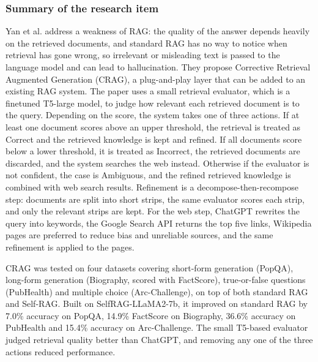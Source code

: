 \documentclass{FastFyp}
\begin{document}
\subsubsection{Summary of the research item}
Yan et al. \cite{yan2024corrective} address a weakness of RAG: the quality of the answer depends heavily on the retrieved documents, and standard RAG has no way to notice when retrieval has gone wrong, so irrelevant or misleading text is passed to the language model and can lead to hallucination. They propose Corrective Retrieval Augmented Generation (CRAG), a plug-and-play layer that can be added to an existing RAG system. The paper uses a small retrieval evaluator, which is a finetuned T5-large model, to judge how relevant each retrieved document is to the query. Depending on the score, the system takes one of three actions. If at least one document scores above an upper threshold, the retrieval is treated as Correct and the retrieved knowledge is kept and refined. If all documents score below a lower threshold, it is treated as Incorrect, the retrieved documents are discarded, and the system searches the web instead. Otherwise if the evaluator is not confident, the case is Ambiguous, and the refined retrieved knowledge is combined with web search results. Refinement is a decompose-then-recompose step: documents are split into short strips, the same evaluator scores each strip, and only the relevant strips are kept. For the web step, ChatGPT rewrites the query into keywords, the Google Search API returns the top five links, Wikipedia pages are preferred to reduce bias and unreliable sources, and the same refinement is applied to the pages.

CRAG was tested on four datasets covering short-form generation (PopQA), long-form generation (Biography, scored with FactScore), true-or-false questions (PubHealth) and multiple choice (Arc-Challenge), on top of both standard RAG and Self-RAG. Built on SelfRAG-LLaMA2-7b, it improved on standard RAG by 7.0\% accuracy on PopQA, 14.9\% FactScore on Biography, 36.6\% accuracy on PubHealth and 15.4\% accuracy on Arc-Challenge. The small T5-based evaluator judged retrieval quality better than ChatGPT, and removing any one of the three actions reduced performance.
\end{document}
